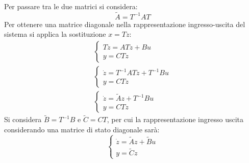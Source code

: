 \documentclass{article}
\numberwithin{equation}{subsection}
\begin{document}
Per passare tra le due matrici si considera:
\begin{equation*}
    \tilde A=T^{-1}AT
\end{equation*}
Per ottenere una matrice diagonale nella rappresentazione ingresso-uscita del sistema si applica la sostituzione $x=Tz$:
\begin{gather*}
    \begin{cases}
        T\dot z=ATz+Bu\\
        y=CTz
    \end{cases}\\
    \begin{cases}
        \dot z=T^{-1}ATz+T^{-1}Bu\\
        y=CTz
    \end{cases}\\
    \begin{cases}
        \dot z=\tilde Az+T^{-1}Bu\\
        y=CTz
    \end{cases}
\end{gather*}
Si considera $\tilde B=T^{-1}B$ e $\tilde C=CT$, per cui la rappresentazione ingresso uscita considerando una matrice di stato diagonale sarà:
\begin{equation*}
    \begin{cases}
        \dot z=\tilde Az+\tilde Bu\\
        y=\tilde Cz
    \end{cases}
\end{equation*}
\end{document}
